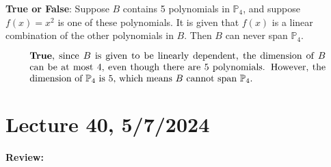 \documentclass{article}
\begin{document}
\noindent\textbf{True or False}: Suppose \( B \) contains 5 polynomials in \( \mathbb{P}_4 \), and
suppose \( f(x) = x^2 \) is one of these polynomials. It is given that \( f(x) \) is a linear
combination of the other polynomials in \( B \). Then \( B \) can never span \( \mathbb{P}_4 \).

\[
\parbox{0.9\textwidth}{
\textbf{True}, since \( B \) is given to be linearly dependent, the dimension of \( B \)
can be at most 4, even though there are 5 polynomials. However, the dimension of 
\(\mathbb{P}_4\) is 5, which means \( B \) cannot span \(\mathbb{P}_4\).
}
\]



\section{Lecture 40, 5/7/2024}

\textbf{Review:}
\end{document}
